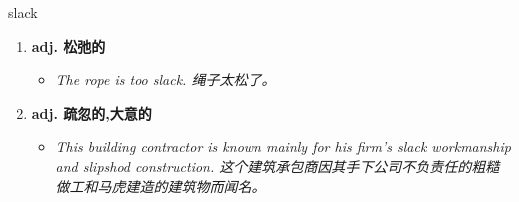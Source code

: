 
\begin{frame}
{\huge slack}
\begin{center}
\begin{enumerate}\Large
  \item \textbf{adj. 松弛的}
  \begin{itemize}
    \item \em{\Large{The rope is too slack. 绳子太松了。}}
  \end{itemize}
  \item \textbf{adj. 疏忽的,大意的}
  \begin{itemize}
    \item \em{\Large{This building contractor is known mainly for his firm's slack workmanship and slipshod construction. 这个建筑承包商因其手下公司不负责任的粗糙做工和马虎建造的建筑物而闻名。}}
  \end{itemize}
\end{enumerate}
\end{center}
\end{frame}
